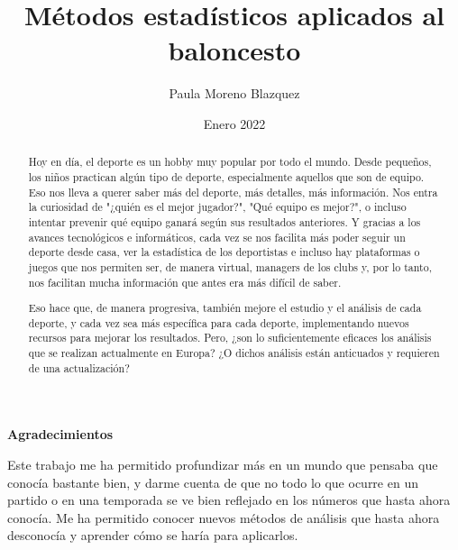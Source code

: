 \documentclass[paper=a4, fontsize=9pt]{article}
\title{Métodos estadísticos aplicados al baloncesto}
\author{Paula Moreno Blazquez}
\date{Enero 2022}
\begin{document}


\maketitle

\clearpage

\begin{minipage}{.8\textwidth}

\textbf{Agradecimientos}

Este trabajo me ha permitido profundizar más en un mundo que pensaba que conocía bastante bien, y darme cuenta de que no todo lo que ocurre en un partido o en una temporada se ve bien reflejado en los números que hasta ahora conocía. Me ha permitido conocer nuevos métodos de análisis que hasta ahora desconocía y aprender cómo se haría para aplicarlos.

\end{minipage}


\clearpage

\begin{abstract}

Hoy en día, el deporte es un hobby muy popular por todo el mundo. Desde pequeños, los niños practican algún tipo de deporte, especialmente aquellos que son de equipo. Eso nos lleva a querer saber más del deporte, más detalles, más información. Nos entra la curiosidad de "¿quién es el mejor jugador?", "Qué equipo es mejor?", o incluso intentar prevenir qué equipo ganará según sus resultados anteriores. Y gracias a los avances tecnológicos e informáticos, cada vez se nos facilita más poder seguir un deporte desde casa, ver la estadística de los deportistas e incluso hay plataformas o juegos que nos permiten ser, de manera virtual, managers de los clubs y, por lo tanto, nos facilitan mucha información que antes era más difícil de saber.

Eso hace que, de manera progresiva, también mejore el estudio y el análisis de cada deporte, y cada vez sea más específica para cada deporte, implementando nuevos recursos para mejorar los resultados. Pero, ¿son lo suficientemente eficaces los análisis que se realizan actualmente en Europa? ¿O dichos análisis están anticuados y requieren de una actualización?

\end{abstract}

\clearpage


\pagebreak            
\newpage              
\end{document}
